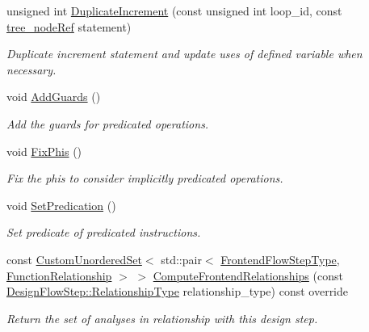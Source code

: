 \begin{DoxyCompactItemize}
unsigned int \hyperlink{classVectorize_ae0735ec00e07e40a9bc81fce55521bfc}{Duplicate\+Increment} (const unsigned int loop\+\_\+id, const \hyperlink{tree__node_8hpp_a6ee377554d1c4871ad66a337eaa67fd5}{tree\+\_\+node\+Ref} statement)
\begin{DoxyCompactList}\small\item\em Duplicate increment statement and update uses of defined variable when necessary. \end{DoxyCompactList}\item 
void \hyperlink{classVectorize_a48aec19b5e26bacfd5cc28103057526a}{Add\+Guards} ()
\begin{DoxyCompactList}\small\item\em Add the guards for predicated operations. \end{DoxyCompactList}\item 
void \hyperlink{classVectorize_ad00739ff3efe2a9d5b2676fbc2a461be}{Fix\+Phis} ()
\begin{DoxyCompactList}\small\item\em Fix the phis to consider implicitly predicated operations. \end{DoxyCompactList}\item 
void \hyperlink{classVectorize_ac12fc968628410acaa5e3dd126907021}{Set\+Predication} ()
\begin{DoxyCompactList}\small\item\em Set predicate of predicated instructions. \end{DoxyCompactList}\item 
const \hyperlink{classCustomUnorderedSet}{Custom\+Unordered\+Set}$<$ std\+::pair$<$ \hyperlink{frontend__flow__step_8hpp_afeb3716c693d2b2e4ed3e6d04c3b63bb}{Frontend\+Flow\+Step\+Type}, \hyperlink{classFrontendFlowStep_af7cf30f2023e5b99e637dc2058289ab0}{Function\+Relationship} $>$ $>$ \hyperlink{classVectorize_a949af411d288a13db50925106f15054c}{Compute\+Frontend\+Relationships} (const \hyperlink{classDesignFlowStep_a723a3baf19ff2ceb77bc13e099d0b1b7}{Design\+Flow\+Step\+::\+Relationship\+Type} relationship\+\_\+type) const override
\begin{DoxyCompactList}\small\item\em Return the set of analyses in relationship with this design step. \end{DoxyCompactList}\end{DoxyCompactItemize}
